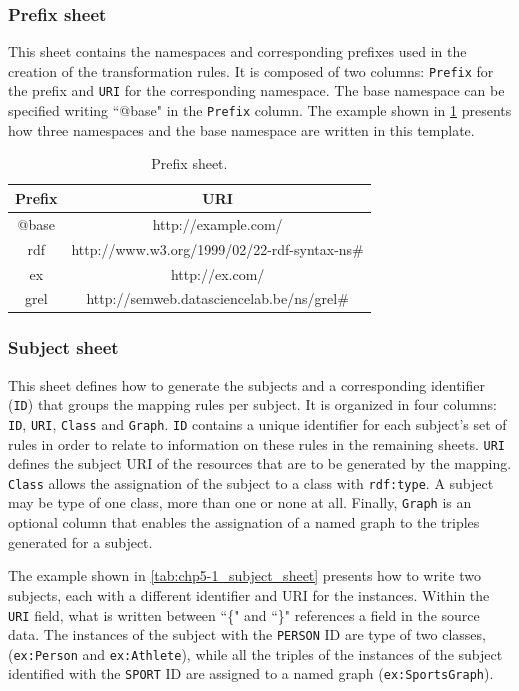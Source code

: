 \subsubsection{Prefix sheet} 
This sheet contains the namespaces and corresponding prefixes used in the creation of the transformation rules. 
It is composed of two columns: \texttt{Prefix} for the prefix and \texttt{URI} for the corresponding namespace. The base namespace can be specified writing ``@base" in the \texttt{Prefix} column. 
The example shown in \cref{tab:chp5-1_prefix_sheet} presents how three namespaces and the base namespace are written in this template. 

\begin{table}[h!]
\caption{Prefix sheet.}
\label{tab:chp5-1_prefix_sheet}
\centering
\begin{tabular}{c|c}
\midrule
\textbf{Prefix} & \textbf{URI}                                 \\ \midrule
@base           & http://example.com/                          \\
rdf             & http://www.w3.org/1999/02/22-rdf-syntax-ns\# \\
ex              & http://ex.com/                               \\ 
grel            & http://semweb.datasciencelab.be/ns/grel\#     \\
\midrule
\end{tabular}
\end{table}


\subsubsection{Subject sheet} 
This sheet defines how to generate the subjects and a corresponding identifier (\texttt{ID}) that groups the mapping rules per subject. It is organized in four columns: \texttt{ID}, \texttt{URI}, \texttt{Class} and \texttt{Graph}. \texttt{ID} contains a unique identifier for each subject's set of rules in order to relate to information on these rules in the remaining sheets.
\texttt{URI} defines the subject URI of the resources that are to be generated by the mapping. 
\texttt{Class} allows the assignation of the subject to a class with \texttt{rdf:type}. A subject may be type of one class, more than one or none at all. 
Finally, \texttt{Graph} is an optional column that enables the assignation of a named graph to the triples generated for a subject.

The example shown in \cref{tab:chp5-1_subject_sheet} presents how to write two subjects, each with a different identifier and URI for the instances. Within the \texttt{URI} field, what is written between ``\{" and ``\}" references a field in the source data. The instances of the subject with the \texttt{PERSON} ID are type of two classes, (\texttt{ex:Person} and \texttt{ex:Athlete}), while all the triples of the instances of the subject identified with the \texttt{SPORT} ID are assigned to a named graph (\texttt{ex:SportsGraph}). 


